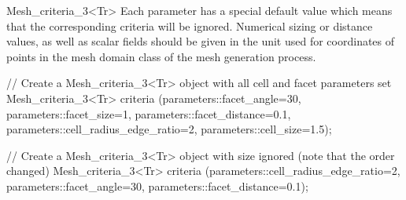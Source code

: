 \begin{ccRefClass}{Mesh_criteria_3<Tr>}
Each parameter has a special default value  which means that the 
corresponding criteria will be ignored.
 Numerical sizing or distance values, as well as scalar fields
should be given in the unit used  for coordinates of points in the mesh domain class
of the mesh generation process.

\ccExample

\begin{ccExampleCode}
// Create a Mesh_criteria_3<Tr> object with all cell and facet parameters set
Mesh_criteria_3<Tr> criteria (parameters::facet_angle=30,
                              parameters::facet_size=1,
                              parameters::facet_distance=0.1,
                              parameters::cell_radius_edge_ratio=2,
                              parameters::cell_size=1.5);

// Create a Mesh_criteria_3<Tr> object with size ignored (note that the order changed)
Mesh_criteria_3<Tr> criteria (parameters::cell_radius_edge_ratio=2,
                              parameters::facet_angle=30,
                              parameters::facet_distance=0.1);
\end{ccExampleCode}

\ccSeeAlso

 \\
\\
 \\
 \\
\\
\\
 \\
 \\
 \\



\end{ccRefClass}

\ccRefPageEnd

